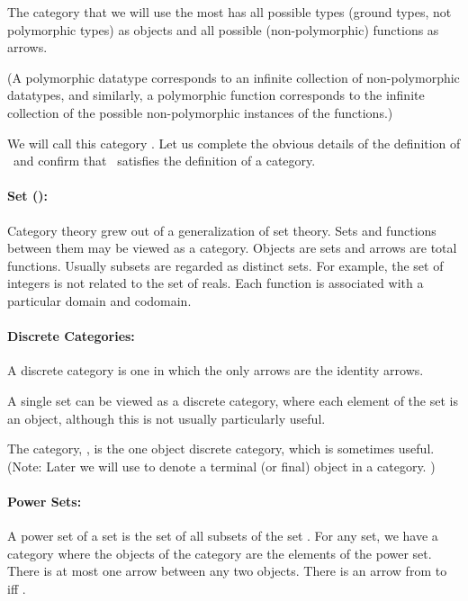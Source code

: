 \documentclass{seminar}
\newcommand{\Ha}{\tmi{Hask}}
\newcommand{\vs}{\vspace{0.3in}}
\begin{document}
\begin{slide}
The category that we will use the most has all possible \Has
types
(ground types, not polymorphic types) as objects and all possible
\Has
(non-polymorphic) functions as arrows.

(A polymorphic datatype corresponds to an infinite collection of
non-polymorphic
datatypes, and similarly, a polymorphic function corresponds to the
infinite
collection of the possible non-polymorphic instances of the functions.)

We will call this category .  Let us complete the
obvious details of the definition of \Ha\, and confirm that \Ha\,
satisfies the definition of a category.

\newslide

\paragraph{Set ():}  Category theory grew out
of a generalization of
set theory.  Sets and functions between them may be viewed as a
category.
Objects are sets and arrows are total functions.  Usually subsets
are regarded
as distinct sets.  For example, the set of integers is not related
to the
set of reals.  Each function is associated with a particular domain
and
codomain.

\vs

\paragraph{Discrete Categories:} A discrete category is one in which
the only
arrows are the identity arrows.

A single set can be viewed as a discrete category, where each element
of the
set is an object, although this is not usually particularly useful.

The category, \one, is the one object discrete category, which is
sometimes
useful.  (Note:  Later we will use  to denote a terminal (or
final)
object in a category. )

\newslide

\paragraph{Power Sets:}  A power set 
of a set  is the set of all subsets of the set .  For
any set, we have a category where the objects of the category are
the
elements of the power set.  There is at most one arrow between any
two
objects.  There is an arrow from  to  iff .


\end{slide}
\end{document}
